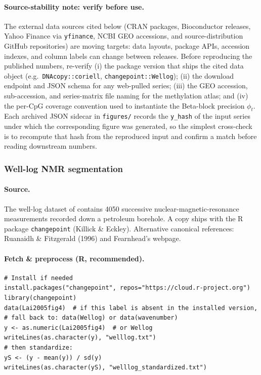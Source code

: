\paragraph{Source-stability note: verify before use.}
The external data sources cited below (CRAN packages, Bioconductor releases, Yahoo Finance via
\texttt{yfinance}, NCBI GEO accessions, and source-distribution GitHub repositories) are moving
targets: data layouts, package APIs, accession indexes, and column labels can change between
releases. Before reproducing the published numbers, re-verify (i) the package version that ships
the cited data object (e.g.\ \texttt{DNAcopy::coriell}, \texttt{changepoint::Wellog}); (ii) the
download endpoint and JSON schema for any web-pulled series; (iii) the GEO accession,
sub-accession, and series-matrix file naming for the methylation atlas; and (iv) the per-CpG
coverage convention used to instantiate the Beta-block precision $\phi_t$. Each archived JSON
sidecar in \texttt{figures/} records the \texttt{y\_hash} of the input series under which the
corresponding figure was generated, so the simplest cross-check is to recompute that hash from
the reproduced input and confirm a match before reading downstream numbers.

\subsubsection{Well-log NMR segmentation}
\label{app:real-data-welllog}

\paragraph{Source.}
The well-log dataset of \citet{fearnhead2006exact} contains 4050 successive nuclear-magnetic-resonance
measurements recorded down a petroleum borehole. A copy ships with the R package
\texttt{changepoint} (Killick \& Eckley). Alternative canonical references: Ruanaidh \& Fitzgerald
(1996) and Fearnhead's webpage.

\paragraph{Fetch \& preprocess (R, recommended).}
\begin{verbatim}
# Install if needed
install.packages("changepoint", repos="https://cloud.r-project.org")
library(changepoint)
data(Lai2005fig4)  # if this label is absent in the installed version,
# fall back to: data(Wellog) or data(wavenumber)
y <- as.numeric(Lai2005fig4)  # or Wellog
writeLines(as.character(y), "welllog.txt")
# then standardize:
yS <- (y - mean(y)) / sd(y)
writeLines(as.character(yS), "welllog_standardized.txt")
\end{verbatim}

